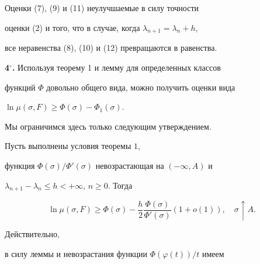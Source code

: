 \begin{note} Оценки (7), (9) и (11) неулучшаемые в силу точности


оценки (2) и того, что в случае, когда $\lambda_{n+1}=\lambda_n+h$,


все неравенства (8), (10) и (12) превращаются в равенства.


\end{note}





{\bf 4${}^\circ$.} Используя теорему 1 и лемму для определенных классов 


функций $\Phi$ довольно общего вида, можно получить оценки вида


$\ln\mu(\sigma,F)\ge\Phi(\sigma)-\Phi_1(\sigma)$.


Мы ограничимся здесь только следующим утверждением.





\begin{thm} Пусть выполнены условия теоремы $1$,


функция $\Phi(\sigma)/\Phi'(\sigma)$ невозрастающая на $(-\infty, A)$ и


$\lambda_{n+1}-\lambda_n\le h<+\infty$, $n\ge 0$. Тогда 


$$


\ln\mu(\sigma,F)\ge \Phi(\sigma)-


\frac{h}{2}\frac{\Phi(\sigma)}{\Phi'(\sigma)}(1+o(1)),\quad


\sigma\uparrow A.  


$$


\end{thm}





Действительно,


в силу леммы и невозрастания функции $\Phi(\varphi(t))/t$ имеем


